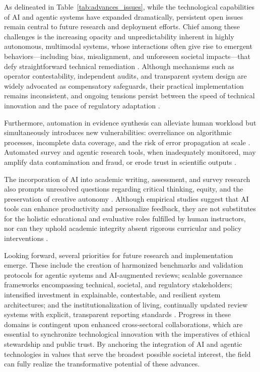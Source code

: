 \documentclass[sigconf]{acmart}
\begin{document}
As delineated in Table~\ref{tab:advances_issues}, while the technological capabilities of AI and agentic systems have expanded dramatically, persistent open issues remain central to future research and deployment efforts. Chief among these challenges is the increasing opacity and unpredictability inherent in highly autonomous, multimodal systems, whose interactions often give rise to emergent behaviors—including bias, misalignment, and unforeseen societal impacts—that defy straightforward technical remediation \cite{ref95,ref96,ref100,ref110}. Although mechanisms such as operator contestability, independent audits, and transparent system design are widely advocated as compensatory safeguards, their practical implementation remains inconsistent, and ongoing tensions persist between the speed of technical innovation and the pace of regulatory adaptation \cite{ref97,ref98,ref100,ref106}.

Furthermore, automation in evidence synthesis can alleviate human workload but simultaneously introduces new vulnerabilities: overreliance on algorithmic processes, incomplete data coverage, and the risk of error propagation at scale \cite{ref74,ref80,ref84,ref102,ref104}. Automated survey and agentic research tools, when inadequately monitored, may amplify data contamination and fraud, or erode trust in scientific outputs \cite{ref89,ref90,ref91,ref92,ref93,ref94,ref95,ref96,ref97,ref98,ref100,ref101,ref105,ref106,ref113,ref114,ref115}.

The incorporation of AI into academic writing, assessment, and survey research also prompts unresolved questions regarding critical thinking, equity, and the preservation of creative autonomy \cite{ref86,ref87,ref88,ref89,ref90,ref91,ref92,ref93,ref94,ref101,ref114,ref115,ref117}. Although empirical studies suggest that AI tools can enhance productivity and personalize feedback, they are not substitutes for the holistic educational and evaluative roles fulfilled by human instructors, nor can they uphold academic integrity absent rigorous curricular and policy interventions \cite{ref87,ref89,ref92,ref94,ref114,ref115,ref117}.

Looking forward, several priorities for future research and implementation emerge. These include the creation of harmonized benchmarks and validation protocols for agentic systems and AI-augmented reviews; scalable governance frameworks encompassing technical, societal, and regulatory stakeholders; intensified investment in explainable, contestable, and resilient system architectures; and the institutionalization of living, continually updated review systems with explicit, transparent reporting standards \cite{ref74,ref75,ref80,ref84,ref95,ref97,ref98,ref100,ref102,ref104,ref106,ref109,ref110,ref113,ref114}. Progress in these domains is contingent upon enhanced cross-sectoral collaborations, which are essential to synchronize technological innovation with the imperatives of ethical stewardship and public trust. By anchoring the integration of AI and agentic technologies in values that serve the broadest possible societal interest, the field can fully realize the transformative potential of these advances.
\end{document}
